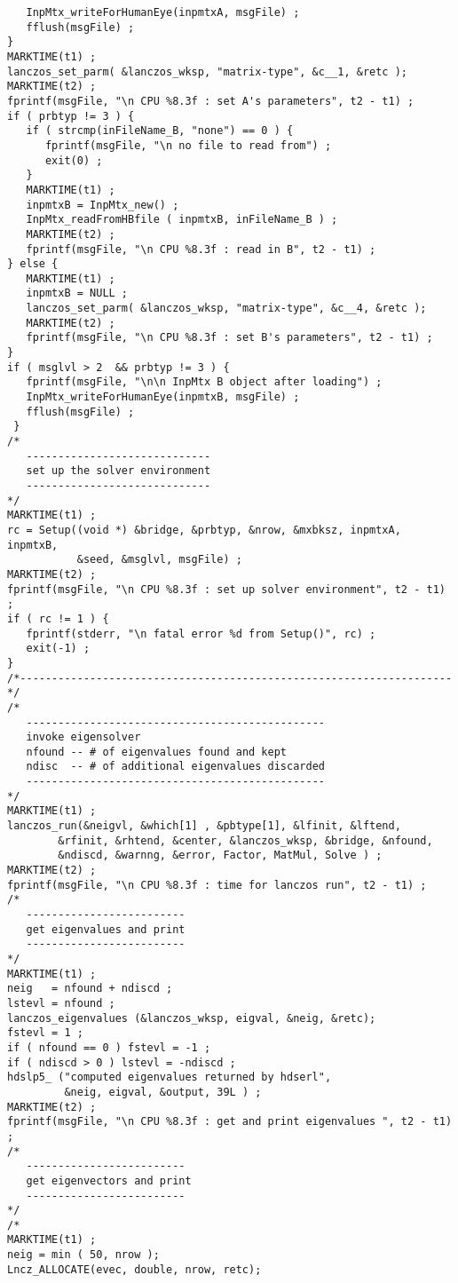 \begin{verbatim}
   InpMtx_writeForHumanEye(inpmtxA, msgFile) ;
   fflush(msgFile) ;
}
MARKTIME(t1) ;
lanczos_set_parm( &lanczos_wksp, "matrix-type", &c__1, &retc );
MARKTIME(t2) ;
fprintf(msgFile, "\n CPU %8.3f : set A's parameters", t2 - t1) ;
if ( prbtyp != 3 ) {
   if ( strcmp(inFileName_B, "none") == 0 ) {
      fprintf(msgFile, "\n no file to read from") ;
      exit(0) ;
   }
   MARKTIME(t1) ;
   inpmtxB = InpMtx_new() ;
   InpMtx_readFromHBfile ( inpmtxB, inFileName_B ) ;
   MARKTIME(t2) ;
   fprintf(msgFile, "\n CPU %8.3f : read in B", t2 - t1) ;
} else {
   MARKTIME(t1) ;
   inpmtxB = NULL ;
   lanczos_set_parm( &lanczos_wksp, "matrix-type", &c__4, &retc );
   MARKTIME(t2) ;
   fprintf(msgFile, "\n CPU %8.3f : set B's parameters", t2 - t1) ;
}
if ( msglvl > 2  && prbtyp != 3 ) {
   fprintf(msgFile, "\n\n InpMtx B object after loading") ;
   InpMtx_writeForHumanEye(inpmtxB, msgFile) ;
   fflush(msgFile) ;
 }
/*
   -----------------------------
   set up the solver environment
   -----------------------------
*/
MARKTIME(t1) ;
rc = Setup((void *) &bridge, &prbtyp, &nrow, &mxbksz, inpmtxA, inpmtxB,
           &seed, &msglvl, msgFile) ;
MARKTIME(t2) ;
fprintf(msgFile, "\n CPU %8.3f : set up solver environment", t2 - t1) ;
if ( rc != 1 ) {
   fprintf(stderr, "\n fatal error %d from Setup()", rc) ;
   exit(-1) ;
}
/*--------------------------------------------------------------------*/
/*
   -----------------------------------------------
   invoke eigensolver
   nfound -- # of eigenvalues found and kept
   ndisc  -- # of additional eigenvalues discarded
   -----------------------------------------------
*/
MARKTIME(t1) ;
lanczos_run(&neigvl, &which[1] , &pbtype[1], &lfinit, &lftend, 
	    &rfinit, &rhtend, &center, &lanczos_wksp, &bridge, &nfound,
	    &ndiscd, &warnng, &error, Factor, MatMul, Solve ) ;
MARKTIME(t2) ;
fprintf(msgFile, "\n CPU %8.3f : time for lanczos run", t2 - t1) ;
/*
   -------------------------
   get eigenvalues and print
   -------------------------
*/
MARKTIME(t1) ;
neig   = nfound + ndiscd ;
lstevl = nfound ;
lanczos_eigenvalues (&lanczos_wksp, eigval, &neig, &retc);
fstevl = 1 ;
if ( nfound == 0 ) fstevl = -1 ;
if ( ndiscd > 0 ) lstevl = -ndiscd ;
hdslp5_ ("computed eigenvalues returned by hdserl",
         &neig, eigval, &output, 39L ) ;
MARKTIME(t2) ;
fprintf(msgFile, "\n CPU %8.3f : get and print eigenvalues ", t2 - t1) ;
/*
   -------------------------
   get eigenvectors and print
   -------------------------
*/
/*
MARKTIME(t1) ;
neig = min ( 50, nrow );
Lncz_ALLOCATE(evec, double, nrow, retc);


\end{verbatim}
